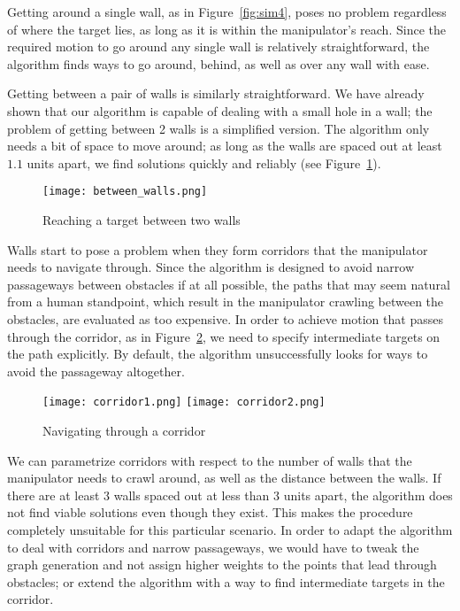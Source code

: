 Getting around a single wall, as in Figure~\ref{fig:sim4}, poses no problem regardless of where the target lies, as long as it is within the manipulator's reach. Since the required motion to go around any single wall is relatively straightforward, the algorithm finds ways to go around, behind, as well as over any wall with ease.

Getting between a pair of walls is similarly straightforward. We have already shown that our algorithm is capable of dealing with a small hole in a wall; the problem of getting between 2 walls is a simplified version. The algorithm only needs a bit of space to move around; as long as the walls are spaced out at least $1.1$ units apart, we find solutions quickly and reliably (see Figure~\ref{fig:2walls}).

\begin{figure}
  \centering
  \texttt{[image: between\_walls.png]}
  \caption{Reaching a target between two walls}\label{fig:2walls}
\end{figure}


Walls start to pose a problem when they form corridors that the manipulator needs to navigate through. Since the algorithm is designed to avoid narrow passageways between obstacles if at all possible, the paths that may seem natural from a human standpoint, which result in the manipulator crawling between the obstacles, are evaluated as too expensive. In order to achieve motion that passes through the corridor, as in Figure~\ref{fig:corridor}, we need to specify intermediate targets on the path explicitly. By default, the algorithm unsuccessfully looks for ways to avoid the passageway altogether.

\begin{figure}[ht]
  \centering
  \begin{minipage}{0.9\textwidth}
    \texttt{[image: corridor1.png]}
    \texttt{[image: corridor2.png]}
  \end{minipage}
  \caption{Navigating through a corridor}\label{fig:corridor}
\end{figure}

We can parametrize corridors with respect to the number of walls that the manipulator needs to crawl around, as well as the distance between the walls. If there are at least $3$ walls spaced out at less than $3$ units apart, the algorithm does not find viable solutions even though they exist. This makes the procedure completely unsuitable for this particular scenario. In order to adapt the algorithm to deal with corridors and narrow passageways, we would have to tweak the graph generation and not assign higher weights to the points that lead through obstacles; or extend the algorithm with a way to find intermediate targets in the corridor.


